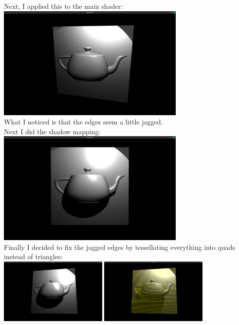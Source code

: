 \documentclass{article}
\begin{document}
Next, I applied this to the main shader:\\
\includegraphics[width=0.7\textwidth]{images/displacementMapFirstAttempt.png}\\
What I noticed is that the edges seem a little jagged.\\[2mm]
Next I did the shadow mapping:\\
\includegraphics[width=0.7\textwidth]{images/jaggedShadows.png}\\[2mm]
Finally I decided to fix the jagged edges by tessellating everything into quads instead of triangles:\\
\includegraphics[width=0.4\textwidth]{images/smootherShadows.png}
\includegraphics[width=0.4\textwidth]{images/quads.png}\\
\end{document}
